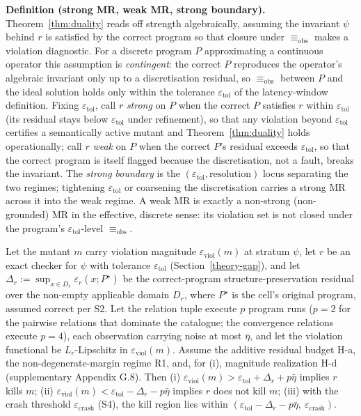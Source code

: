 \documentclass[manuscript,screen,review]{acmart}
\begin{document}
\textbf{Definition (strong MR, weak MR, strong boundary).} Theorem~\ref{thm:duality}
reads off strength algebraically, assuming the invariant $\psi$ behind
$r$ is satisfied by the correct program so that closure under
$\equiv_{\mathrm{obs}}$ makes a violation diagnostic. For a discrete program $P$
approximating a continuous operator this assumption is \emph{contingent}:
the correct $P$ reproduces the operator's algebraic invariant only up to
a discretisation residual, so $\equiv_{\mathrm{obs}}$ between $P$ and the ideal
solution holds only within the tolerance $\varepsilon_{\mathrm{tol}}$ of
the latency-window definition. Fixing $\varepsilon_{\mathrm{tol}}$, call
$r$ \emph{strong} on $P$ when the correct $P$ satisfies $r$ within
$\varepsilon_{\mathrm{tol}}$ (its residual stays below
$\varepsilon_{\mathrm{tol}}$ under refinement), so that any violation
beyond $\varepsilon_{\mathrm{tol}}$ certifies a semantically active
mutant and Theorem~\ref{thm:duality} holds operationally; call $r$ \emph{weak} on $P$
when the correct $P$'s residual exceeds $\varepsilon_{\mathrm{tol}}$, so
that the correct program is itself flagged because the discretisation,
not a fault, breaks the invariant. The \emph{strong boundary} is the
$(\varepsilon_{\mathrm{tol}}, \text{resolution})$ locus separating the
two regimes; tightening $\varepsilon_{\mathrm{tol}}$ or coarsening the
discretisation carries a strong MR across it into the weak regime. A weak
MR is exactly a non-strong (non-grounded) MR in the effective, discrete
sense: its violation set is not closed under the program's
$\varepsilon_{\mathrm{tol}}$-level $\equiv_{\mathrm{obs}}$.

\begin{theorem}\label{thm:window}
Let the mutant $m$ carry violation magnitude
$\varepsilon_{\mathrm{viol}}(m)$ at stratum $\psi$, let $r$ be an exact
checker for $\psi$ with tolerance $\varepsilon_{\mathrm{tol}}$
(Section~\ref{theory-gap}), and let
$\Delta_r := \sup_{x \in D_r} \varepsilon_r(x; P^\star)$ be the
correct-program structure-preservation residual over the non-empty
applicable domain $D_r$, where $P^\star$ is the cell's original program,
assumed correct per S2. Let the relation tuple execute $p$ program runs
($p = 2$ for the pairwise relations that dominate the catalogue; the
convergence relations execute $p = 4$), each observation carrying noise
at most $\bar\eta$, and let the violation functional be
$L_r$-Lipschitz in $\varepsilon_{\mathrm{viol}}(m)$. Assume the additive
residual budget H-a, the non-degenerate-margin regime R1, and, for (i),
magnitude realization H-d (supplementary Appendix G.8). Then
(i) $\varepsilon_{\mathrm{viol}}(m) > \varepsilon_{\mathrm{tol}} + \Delta_r + p\bar\eta$
implies $r$ kills $m$;
(ii) $\varepsilon_{\mathrm{viol}}(m) < \varepsilon_{\mathrm{tol}} - \Delta_r - p\bar\eta$
implies $r$ does not kill $m$; (iii) with the crash threshold
$\varepsilon_{\mathrm{crash}}$ (S4), the kill region lies within
$(\varepsilon_{\mathrm{tol}} - \Delta_r - p\bar\eta,\ \varepsilon_{\mathrm{crash}})$.
\end{theorem}
\end{document}
